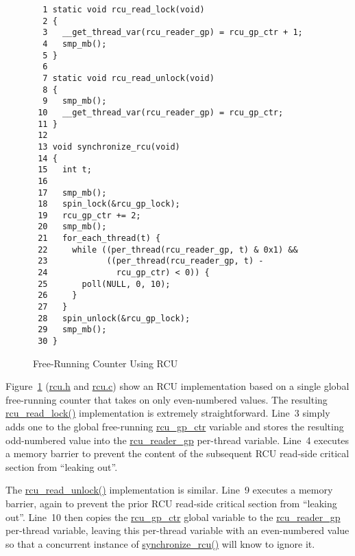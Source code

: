 \begin{figure}[tbp]
{ \scriptsize
\begin{verbatim}
  1 static void rcu_read_lock(void)
  2 {
  3   __get_thread_var(rcu_reader_gp) = rcu_gp_ctr + 1;
  4   smp_mb();
  5 }
  6 
  7 static void rcu_read_unlock(void)
  8 {
  9   smp_mb();
 10   __get_thread_var(rcu_reader_gp) = rcu_gp_ctr;
 11 }
 12 
 13 void synchronize_rcu(void)
 14 {
 15   int t;
 16 
 17   smp_mb();
 18   spin_lock(&rcu_gp_lock);
 19   rcu_gp_ctr += 2;
 20   smp_mb();
 21   for_each_thread(t) {
 22     while ((per_thread(rcu_reader_gp, t) & 0x1) &&
 23            ((per_thread(rcu_reader_gp, t) -
 24              rcu_gp_ctr) < 0)) {
 25       poll(NULL, 0, 10);
 26     }
 27   }
 28   spin_unlock(&rcu_gp_lock);
 29   smp_mb();
 30 }
\end{verbatim}
}
\caption{Free-Running Counter Using RCU}
\label{fig:defer:Free-Running Counter Using RCU}
\end{figure}

Figure~\ref{fig:defer:Free-Running Counter Using RCU}
(\url{rcu.h} and \url{rcu.c})
show an RCU implementation based on a single global free-running counter
that takes on only even-numbered values.
The resulting \url{rcu_read_lock()} implementation is extremely
straightforward.
Line~3 simply adds one to the global free-running \url{rcu_gp_ctr}
variable and stores the resulting odd-numbered value into the
\url{rcu_reader_gp} per-thread variable.
Line~4 executes a memory barrier to prevent the content of the
subsequent RCU read-side critical section from ``leaking out''.

The \url{rcu_read_unlock()} implementation is similar.
Line~9 executes a memory barrier, again to prevent the prior RCU
read-side critical section from ``leaking out''.
Line~10 then copies the \url{rcu_gp_ctr} global variable to the
\url{rcu_reader_gp} per-thread variable, leaving this per-thread
variable with an even-numbered value so that a concurrent instance
of \url{synchronize_rcu()} will know to ignore it.

 \QuickQuizEnd

